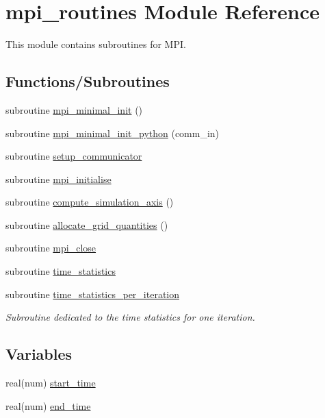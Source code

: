 \hypertarget{namespacempi__routines}{}\section{mpi\+\_\+routines Module Reference}
\label{namespacempi__routines}


This module contains subroutines for M\+PI.  


\subsection*{Functions/\+Subroutines}
\begin{DoxyCompactItemize}
\item 
subroutine \hyperlink{namespacempi__routines_a61438ec53719149e70d0600171070933}{mpi\+\_\+minimal\+\_\+init} ()
\item 
subroutine \hyperlink{namespacempi__routines_a207f6d765479d24553ae1186200a5d9d}{mpi\+\_\+minimal\+\_\+init\+\_\+python} (comm\+\_\+in)
\item 
subroutine \hyperlink{namespacempi__routines_a32b858516b2e2b02580cf4ce8cb40ccc}{setup\+\_\+communicator}
\item 
subroutine \hyperlink{namespacempi__routines_a2574986e9474b6d4144f099df814e257}{mpi\+\_\+initialise}
\item 
subroutine \hyperlink{namespacempi__routines_ac6bf7d666673e87855069981a4a664d5}{compute\+\_\+simulation\+\_\+axis} ()
\item 
subroutine \hyperlink{namespacempi__routines_a483f086b039961c1b48127fc9d81cf65}{allocate\+\_\+grid\+\_\+quantities} ()
\item 
subroutine \hyperlink{namespacempi__routines_ab1a2d976a5017905d06e301f5af07ad2}{mpi\+\_\+close}
\item 
subroutine \hyperlink{namespacempi__routines_a39928834ab9f9c980ffc2e7849cf8af3}{time\+\_\+statistics}
\item 
subroutine \hyperlink{namespacempi__routines_aae81751f0f074a5eba4ddc0126bfd5cd}{time\+\_\+statistics\+\_\+per\+\_\+iteration}
\begin{DoxyCompactList}\small\item\em Subroutine dedicated to the time statistics for one iteration. \end{DoxyCompactList}\end{DoxyCompactItemize}
\subsection*{Variables}
\begin{DoxyCompactItemize}
\item 
real(num) \hyperlink{namespacempi__routines_aa3f567f6443fe088b81d3fb43509a45c}{start\+\_\+time}
\item 
real(num) \hyperlink{namespacempi__routines_a4b0b516f93006e24d942b3f124cb82d4}{end\+\_\+time}
\end{DoxyCompactItemize}


